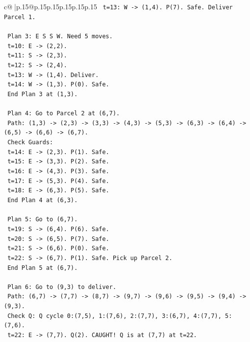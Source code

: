 \documentclass{article}
\begin{document}
{\begin{supertabular}{c@{$\;$}|p{.15\linewidth}@{}p{.15\linewidth}p{.15\linewidth}p{.15\linewidth}p{.15\linewidth}p{.15\linewidth}}
{{{\texttt{   t=13: W {-}> (1,4). P(7). Safe. Deliver Parcel 1.} \\
\\ 
\texttt{   Plan 3: E S S W. Need 5 moves.} \\
\texttt{   t=10: E {-}> (2,2).} \\
\texttt{   t=11: S {-}> (2,3).} \\
\texttt{   t=12: S {-}> (2,4).} \\
\texttt{   t=13: W {-}> (1,4). Deliver.} \\
\texttt{   t=14: W {-}> (1,3). P(0). Safe.} \\
\texttt{   End Plan 3 at (1,3).} \\
\\ 
\texttt{   Plan 4: Go to Parcel 2 at (6,7).} \\
\texttt{   Path: (1,3) {-}> (2,3) {-}> (3,3) {-}> (4,3) {-}> (5,3) {-}> (6,3) {-}> (6,4) {-}> (6,5) {-}> (6,6) {-}> (6,7).} \\
\texttt{   Check Guards:} \\
\texttt{   t=14: E {-}> (2,3). P(1). Safe.} \\
\texttt{   t=15: E {-}> (3,3). P(2). Safe.} \\
\texttt{   t=16: E {-}> (4,3). P(3). Safe.} \\
\texttt{   t=17: E {-}> (5,3). P(4). Safe.} \\
\texttt{   t=18: E {-}> (6,3). P(5). Safe.} \\
\texttt{   End Plan 4 at (6,3).} \\
\\ 
\texttt{   Plan 5: Go to (6,7).} \\
\texttt{   t=19: S {-}> (6,4). P(6). Safe.} \\
\texttt{   t=20: S {-}> (6,5). P(7). Safe.} \\
\texttt{   t=21: S {-}> (6,6). P(0). Safe.} \\
\texttt{   t=22: S {-}> (6,7). P(1). Safe. Pick up Parcel 2.} \\
\texttt{   End Plan 5 at (6,7).} \\
\\ 
\texttt{   Plan 6: Go to (9,3) to deliver.} \\
\texttt{   Path: (6,7) {-}> (7,7) {-}> (8,7) {-}> (9,7) {-}> (9,6) {-}> (9,5) {-}> (9,4) {-}> (9,3).} \\
\texttt{   Check Q: Q cycle 0:(7,5), 1:(7,6), 2:(7,7), 3:(6,7), 4:(7,7), 5:(7,6).} \\
\texttt{   t=22: E {-}> (7,7). Q(2). CAUGHT! Q is at (7,7) at t=22.} \\
}}}
\end{supertabular}}
\end{document}
